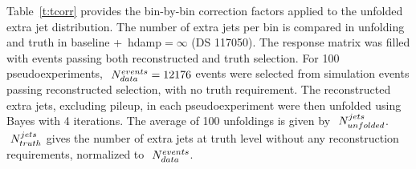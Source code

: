 
Table~\ref{t:tcorr} provides the bin-by-bin correction factors applied to the unfolded extra jet distribution.  The
number of extra jets per bin is compared in unfolding and truth in baseline \pow+\py \ttbar\  hdamp$=\infty$ (DS 117050). 
The response matrix was filled with events passing both reconstructed and truth selection. 
For 100 pseudoexperiments,  $\textrm\ N^{events}_{data}=12176$ events were selected from \ttbar simulation events 
passing reconstructed selection, with no truth requirement. The reconstructed extra jets, excluding pileup, 
in each pseudoexperiment were then unfolded using Bayes with 4 iterations. The average of 100 unfoldings 
is given by $\textrm\ N^{jets}_{unfolded}$. $\textrm\ N^{jets}_{truth} $ gives the number of extra jets at truth level 
without any reconstruction requirements, normalized to $\textrm\ N^{events}_{data}$. 


